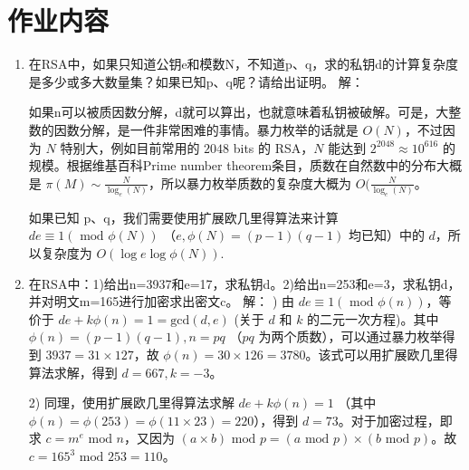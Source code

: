 \documentclass[degree=project,degree-type=project,cjk-font=noto]{thuthesis}
\begin{document}
\maketitle

\frontmatter
% 



\mainmatter

\chapter{作业内容}

\begin{enumerate}
  \setlength{\itemsep}{3\parskip}
  \item 在RSA中，如果只知道公钥e和模数N，不知道p、q，求的私钥d的计算复杂度是多少或多大数量集？如果已知p、q呢？请给出证明。
  \newline
  {\heiti 解：}

  如果n可以被质因数分解，d就可以算出，也就意味着私钥被破解。可是，大整数的因数分解，是一件非常困难的事情。暴力枚举的话就是 $O(N)$，不过因为 $N$ 特别大，例如目前常用的 $2048$ bits 的 RSA，$N$ 能达到 $2^{2048} \approx 10^{616}$ 的规模。根据维基百科Prime number theorem条目，质数在自然数中的分布大概是 $\pi(M) \sim \frac{N}{\log_e (N)}$，所以暴力枚举质数的复杂度大概为 $O(\frac{N}{\log_e (N)}$。

  如果已知 p、q，我们需要使用扩展欧几里得算法来计算 $de \equiv 1 (\text{ mod } \phi(N))$ （$e, \phi(N) = (p-1)(q-1)$ 均已知）中的 $d$，所以复杂度为 $O(\log e \log \phi(N))$.

\item 在RSA中：1)给出n=3937和e=17，求私钥d。2)给出n=253和e=3，求私钥d，并对明文m=165进行加密求出密文c。
\newline
{\heiti 解：}
) 由 $de \equiv 1 (\text{ mod } \phi(n))$，等价于 $de + k\phi(n) = 1 = \text{gcd}(d, e)$ (关于 $d$ 和 $k$ 的二元一次方程)。其中 $\phi(n) = (p-1)(q-1), n=pq$ （$pq$ 为两个质数），可以通过暴力枚举得到 $3937 = 31 \times 127$，故 $\phi(n) = 30 \times 126 = 3780$。该式可以用扩展欧几里得算法求解，得到 $d = 667, k = -3$。

2) 同理，使用扩展欧几里得算法求解 $de + k\phi(n) = 1$ （其中 $\phi(n) = \phi(253) = \phi(11\times23) = 220$），得到 $d = 73$。对于加密过程，即求 $c = m^e \text{ mod } n$，又因为 $(a \times b) \text{ mod } p = (a \text{ mod } p) \times (b \text{ mod } p)$。故 $c = 165^3 \text{ mod } 253 = 110$。


\end{enumerate}
\end{document}
